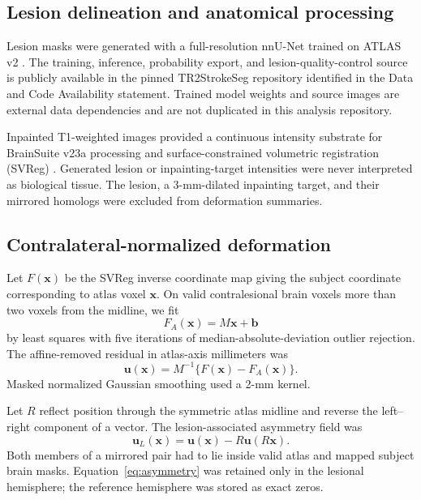 \documentclass[11pt]{article}
\begin{document}
\subsection{Lesion delineation and anatomical processing}

Lesion masks were generated with a full-resolution nnU-Net
\citep{Isensee2021} trained on ATLAS v2 \citep{Liew2022}. The training,
inference, probability export, and lesion-quality-control source is publicly
available in the pinned TR2StrokeSeg repository identified in the Data and Code
Availability statement. Trained model weights and source images are external
data dependencies and are not duplicated in this analysis repository.

Inpainted T1-weighted images provided a continuous intensity substrate for
BrainSuite v23a processing \citep{Shattuck2002} and surface-constrained
volumetric registration (SVReg) \citep{Joshi2009}. Generated lesion or
inpainting-target intensities were never interpreted as biological tissue. The
lesion, a 3-mm-dilated inpainting target, and their mirrored homologs were
excluded from deformation summaries.

\subsection{Contralateral-normalized deformation}

Let $F(\mathbf{x})$ be the SVReg inverse coordinate map giving the subject
coordinate corresponding to atlas voxel $\mathbf{x}$. On valid contralesional
brain voxels more than two voxels from the midline, we fit
\begin{equation}
 F_A(\mathbf{x}) = M\mathbf{x}+\mathbf{b}
\end{equation}
by least squares with five iterations of median-absolute-deviation outlier
rejection. The affine-removed residual in atlas-axis millimeters was
\begin{equation}
 \mathbf{u}(\mathbf{x}) = M^{-1}\{F(\mathbf{x})-F_A(\mathbf{x})\}.
 \label{eq:residual}
\end{equation}
Masked normalized Gaussian smoothing used a 2-mm kernel.

Let $R$ reflect position through the symmetric atlas midline and reverse the
left--right component of a vector. The lesion-associated asymmetry field was
\begin{equation}
 \mathbf{u}_L(\mathbf{x}) =
 \mathbf{u}(\mathbf{x})-R\mathbf{u}(R\mathbf{x}).
 \label{eq:asymmetry}
\end{equation}
Both members of a mirrored pair had to lie inside valid atlas and mapped
subject brain masks. Equation~\ref{eq:asymmetry} was retained only in the
lesional hemisphere; the reference hemisphere was stored as exact zeros.
\end{document}
